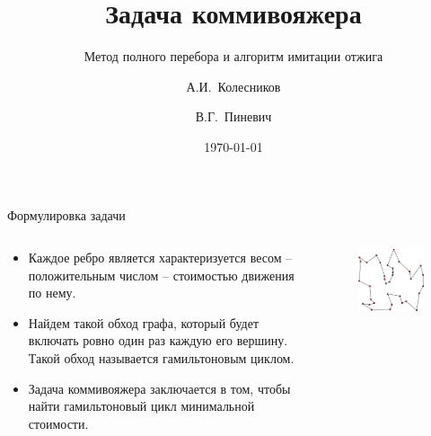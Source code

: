 \documentclass[ignoreonframetext,unicode]{beamer}
\title{Задача коммивояжера}
\subtitle{Метод полного перебора и алгоритм имитации отжига}
\author{А.И.~Колесников \and В.Г.~Пиневич}
\institute[]{МГТУ им. Н.Э.~Баумана}
\date{\today}
\begin{document}
	
\begin{frame}[plain]
		\maketitle
\end{frame}

\begin{frame}{Формулировка задачи}

	\begin{columns}
		\begin{column}{0.65\textwidth}
		\begin{itemize}
			
		\item Каждое ребро является характеризуется весом – положительным числом – стоимостью движения по нему.
		
		\item Найдем такой обход графа, который будет включать ровно один раз каждую его вершину. Такой обход называется гамильтоновым циклом.
			
		\item Задача коммивояжера заключается в том, чтобы найти гамильтоновый цикл минимальной стоимости.
		\end{itemize}	
		\end{column}
		\begin{column}{0.4\textwidth}
		\begin{figure}[!h]
			\begin{center}
				\includegraphics[scale=0.35]{SMP_pic}
			\end{center}
		\end{figure}
	

\end{column}
\end{columns}
\end{frame}
\end{document}
